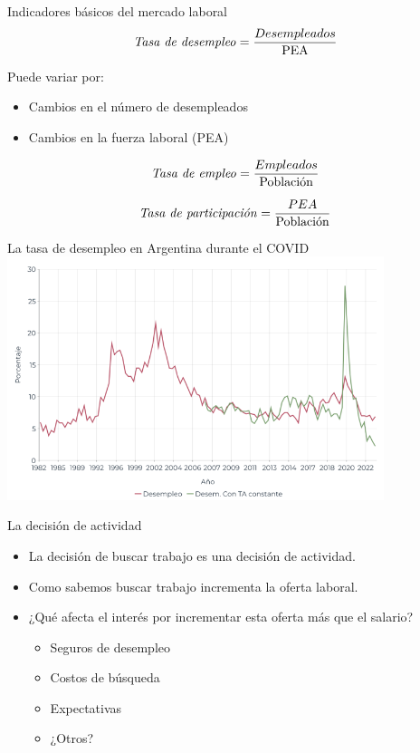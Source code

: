 \documentclass{beamer}
\newcommand\dangersignw[1][2ex]{%
  \scaleto{\stackengine{0.3pt}{\scalebox{1.1}[.9]{%
  \color{red}$\blacktriangle$}}{\color{white}\tiny\bfseries !}{O}{c}{F}{F}{L}}{#1}%
}
\begin{document}
\begin{frame}{Indicadores básicos del mercado laboral}
    \[ \text {\textit{Tasa de desempleo}} = \frac{Desempleados}{\text{PEA}} \]
    
    \dangersignw Puede variar por: 
    \begin{itemize}
        \item Cambios en el número de desempleados
        \item Cambios en la fuerza laboral (PEA)
    \end{itemize}
    \[ \text {\textit{Tasa de empleo}} = \frac{Empleados}{\text{Población}} \]

    \[ \text {\textit{Tasa de participación}} = \frac{PEA}{\text{Población}} \]
\end{frame}

\begin{frame}{La tasa de desempleo en Argentina durante el COVID}
\centering\includegraphics[width=11cm]{../Figures/C34.15.png}
\end{frame}

\begin{frame}{La decisión de actividad}
    \begin{itemize}
        \item La decisión de buscar trabajo es una decisión de actividad.
        \item Como sabemos buscar trabajo incrementa la oferta laboral.
        \item ¿Qué afecta el interés por incrementar esta oferta más que el salario?
        \begin{itemize}
            \item Seguros de desempleo
            \item Costos de búsqueda
            \item Expectativas
            \item ¿Otros?
        \end{itemize}
    \end{itemize}
\end{frame}
\end{document}
